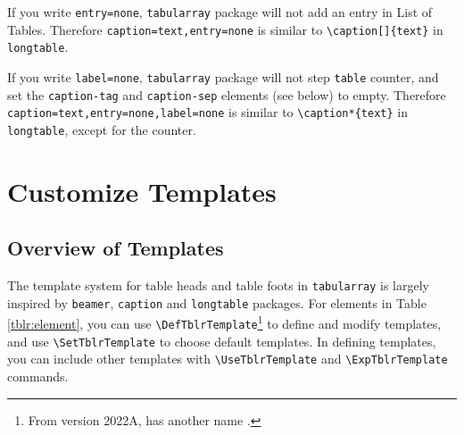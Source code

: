\documentclass[oneside]{book}
\begin{document}
If you write \verb!entry=none!, \verb!tabularray! package will not add an entry in List of Tables.
Therefore \verb!caption=text,entry=none! is similar to \verb!\caption[]{text}! in \verb!longtable!.

If you write \verb!label=none!, \verb!tabularray! package will not step \verb!table! counter,
and set the \verb!caption-tag! and \verb!caption-sep! elements (see below) to empty.
Therefore \verb!caption=text,entry=none,label=none! is similar to \verb!\caption*{text}!
in \verb!longtable!, except for the counter.

\section{Customize Templates}

\subsection{Overview of Templates}

The template system for table heads and table foots in \verb!tabularray! is largely inspired
by \verb!beamer!, \verb!caption! and \verb!longtable! packages. For elements in Table \ref{tblr:element},
you can use \verb!\DefTblrTemplate!\footnote{From version 2022A,
\texttt{\string\DefTblrTemplate} has another name \texttt{\string\DeclareTblrTemplate}.}
to define and modify templates,
and use \verb!\SetTblrTemplate! to choose default templates. In defining templates,
you can include other templates with \verb!\UseTblrTemplate! and \verb!\ExpTblrTemplate! commands.
\end{document}

